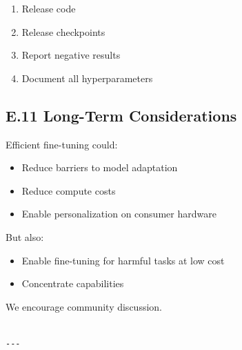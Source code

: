 \begin{enumerate}
\item Release code
\item Release checkpoints
\item Report negative results
\item Document all hyperparameters

\end{enumerate}
\subsection{E.11 Long-Term Considerations}

Efficient fine-tuning could:

\begin{itemize}
\item Reduce barriers to model adaptation
\item Reduce compute costs
\item Enable personalization on consumer hardware

\end{itemize}
But also:

\begin{itemize}
\item Enable fine-tuning for harmful tasks at low cost
\item Concentrate capabilities

\end{itemize}
We encourage community discussion.
\begin{lstlisting}

---
\end{lstlisting}